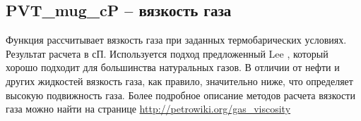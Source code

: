 
\newcommand{\MuDataFile}{data/Muo_P_data.txt}

\subsection{PVT\_mug\_cP – вязкость газа}

Функция рассчитывает вязкость газа при заданных термобарических условиях. Результат расчета в сП.  Используется подход предложенный Lee  \cite{Lee_1966}, который хорошо подходит для большинства натуральных газов. 
В отличии от нефти и других жидкостей вязкость газа, как правило, значительно ниже, что определяет высокую подвижность газа. 
Более подробное описание методов расчета вязкости газа можно найти на странице  \href{http://petrowiki.org/Gas_viscosity}{http://petrowiki.org/gas\_viscosity}



